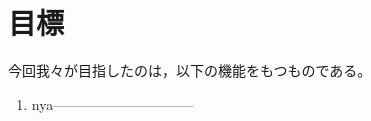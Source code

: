 \documentclass[report.tex]{subfiles}
\begin{document}
\section{目標}
今回我々が目指したのは，以下の機能をもつものである。
\begin{enumerate}
  \item nya------------------------------
\end{enumerate}
\end{document}
